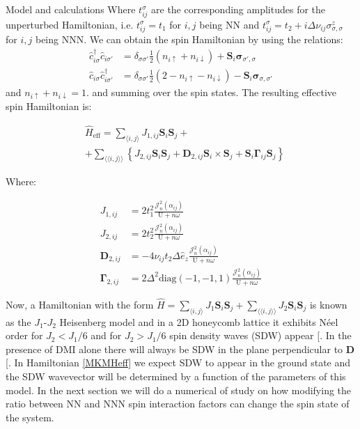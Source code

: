\documentclass[aps,prl,twocolumn,amsmath,amssymb,superscriptaddress,nobibnotes]{revtex4}%
\renewcommand{\cite}[1]{{[}\onlinecite{#1}{]}}
\newcommand{\n}{\nonumber}
\newcommand{\bs}{\boldsymbol}
\begin{document}
\begin{section}{Model and calculations}
Where $t_{ij}^{\sigma}$ are the corresponding amplitudes for the unperturbed Hamiltonian, i.e. $t_{ij}^{\sigma} = t_1$ for $i,j$ being NN and $t_{ij}^{\sigma} = t_2 + i\Delta\nu_{ij}\sigma^z_{\sigma, \sigma}$ for $i,j$ being NNN. We can obtain the spin Hamiltonian by using the relations:
\begin{align}
\hat{c}_{i \sigma}^\dagger \hat{c}_{i \sigma'} &= \delta_{\sigma \sigma'} \frac{1}{2} (n_{i \uparrow} + n_{i \downarrow}) + \boldsymbol{S}_i\boldsymbol{\sigma}_{\sigma', \sigma} \label{SpinOperatorInv1}\\ 
\hat{c}_{i \sigma} \hat{c}_{i \sigma'}^\dagger &= \delta_{\sigma \sigma'} \frac{1}{2} (2 - n_{i \uparrow} - n_{i \downarrow}) - \boldsymbol{S}_i\boldsymbol{\sigma}_{\sigma, \sigma'} \label{SpinOperatorInv2}
\end{align}
and $n_{i \uparrow} + n_{i \downarrow} = 1$. 
and summing over the spin states. The resulting effective spin Hamiltonian is:

\begin{align}
\label{MKMHeff}
&\hat{H}_{\text{eff}} = \sum_{\langle i,j \rangle} J_{1,ij}\bs{S}_i\bs{S}_j +\n \\
&+ \sum_{\langle \langle i,j \rangle \rangle} \left\{ J_{2,ij}\bs{S}_i\bs{S}_j + \bs{D}_{2,ij} \bs{S}_i \times \bs{S}_j + \bs{S}_i \bs{\Gamma}_{ij} \bs{S}_j \right\}
\end{align}

Where:

\begin{align*}
J_{1,ij} &= 2t_1^2\frac{\mathcal{J}_{n}^2(\alpha_{ij})}{\text{U}+n\omega} \\
J_{2,ij} &= 2t_2^2\frac{\mathcal{J}_{n}^2(\alpha_{ij})}{\text{U}+n\omega} \\
\bs{D}_{2,ij} &= - 4\nu_{ij} t_2 \Delta \hat{e}_z \frac{\mathcal{J}_{n}^2(\alpha_{ij})}{\text{U}+n\omega} \\
\bs{\Gamma}_{2,ij} &= 2\Delta^2 \text{diag}(-1,-1,1) \frac{\mathcal{J}_{n}^2(\alpha_{ij})}{\text{U}+n\omega}
\end{align*}

Now, a Hamiltonian with the form $\hat{H} = \sum_{\langle i,j \rangle} J_1 \bs{S}_i\bs{S}_j + \sum_{\langle \langle i,j \rangle \rangle} J_2\bs{S}_i\bs{S}_j$ is known as the $J_1$-$J_2$ Heisenberg model and in a 2D honeycomb lattice it exhibits N\'eel order for $J_2 < J_1 / 6$ and for $J_2 > J_1 / 6$ spin density waves (SDW) appear \cite{Mulder2010}. In the presence of DMI alone there will always be SDW in the plane perpendicular to $\bs{D}$ \cite{Uchida2006}. In Hamiltonian \ref{MKMHeff} we expect SDW to appear in the ground state and the SDW wavevector will be determined by a function of the parameters of this model. In the next section we will do a numerical of study on how modifying the ratio between NN and NNN spin interaction factors can change the spin state of the system.


\end{section}
\end{document}
